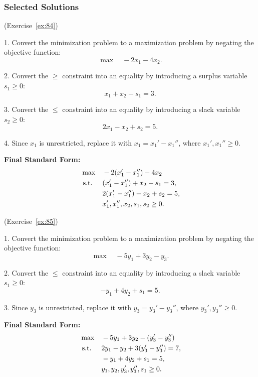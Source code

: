 \subsubsection*{Selected Solutions}

\begin{solution}(Exercise~\ref{ex:84})

1. Convert the minimization problem to a maximization problem by negating the objective function:
   \[
   \max \quad -2x_1 - 4x_2.
   \]

2. Convert the \( \geq \) constraint into an equality by introducing a surplus variable \( s_1 \geq 0 \):
   \[
   x_1 + x_2 - s_1 = 3.
   \]

3. Convert the \( \leq \) constraint into an equality by introducing a slack variable \( s_2 \geq 0 \):
   \[
   2x_1 - x_2 + s_2 = 5.
   \]

4. Since \( x_1 \) is unrestricted, replace it with \( x_1 = x_1' - x_1'' \), where \( x_1', x_1'' \geq 0 \).

\textbf{Final Standard Form:}
\[
\begin{aligned}
    \max \quad & -2(x_1' - x_1'') - 4x_2 \\
    \mbox{ s.t. } \quad
    & (x_1' - x_1'') + x_2 - s_1 = 3, \\
    & 2(x_1' - x_1'') - x_2 + s_2 = 5, \\
    & x_1', x_1'', x_2, s_1, s_2 \geq 0.
\end{aligned}
\]
\end{solution}
\vspace{1cm}

\begin{solution}(Exercise~\ref{ex:85})

1. Convert the minimization problem to a maximization problem by negating the objective function:
   \[
   \max \quad -5y_1 + 3y_2 - y_3.
   \]

2. Convert the \( \leq \) constraint into an equality by introducing a slack variable \( s_1 \geq 0 \):
   \[
   -y_1 + 4y_2 + s_1 = 5.
   \]

3. Since \( y_3 \) is unrestricted, replace it with \( y_3 = y_3' - y_3'' \), where \( y_3', y_3'' \geq 0 \).

\textbf{Final Standard Form:}
\[
\begin{aligned}
    \max \quad & -5y_1 + 3y_2 - (y_3' - y_3'') \\
    \mbox{ s.t. } \quad
    & 2y_1 - y_2 + 3(y_3' - y_3'') = 7, \\
    & -y_1 + 4y_2 + s_1 = 5, \\
    & y_1, y_2, y_3', y_3'', s_1 \geq 0.
\end{aligned}
\]
\end{solution}
\vspace{1cm}

